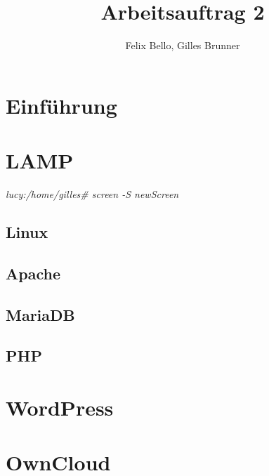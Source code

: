 \documentclass{article}
\author{Felix Bello, Gilles Brunner}
\title{Arbeitsauftrag 2}
\begin{document}
	\maketitle
	\section{Einführung}
	\section{LAMP}
	\textit{lucy:/home/gilles\# screen -S newScreen}
	\subsection{Linux}
	\subsection{Apache}
	\subsection{MariaDB}
	\subsection{PHP}
	\section{WordPress}
	\section{OwnCloud}
\end{document}
